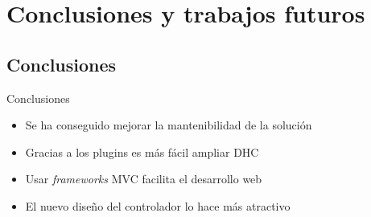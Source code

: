 \documentclass[12pt]{beamer}
\newcommand{\mysection}[1]{\section{#1}}
\begin{document}




\mysection{Conclusiones y trabajos futuros}

\subsection{Conclusiones}
\begin{frame}{Conclusiones}
	\begin{itemize}
		\item Se ha conseguido mejorar la mantenibilidad de la solución
		\item Gracias a los plugins es más fácil ampliar DHC
		\item Usar \emph{frameworks} MVC facilita el desarrollo web
		\item El nuevo diseño del controlador lo hace más atractivo
	\end{itemize}
\end{frame}
\end{document}

